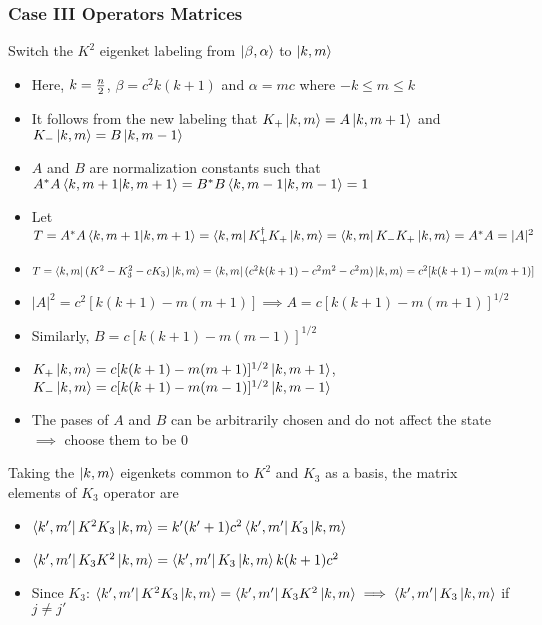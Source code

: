 \documentclass[8pt,t,mathserif,aspectratio=169]{beamer}
\begin{document}
\begin{frame}
  \frametitle{Case III Operators Matrices}
  \vspace{1mm}
  Switch the $K^2$ eigenket labeling from $\ket{\beta,\alpha}$ to $\ket{k,m}$
  \begin{itemize}
    \item Here, $k = {n \over 2}$, $\beta = c^2 k(k + 1)$ and $\alpha = mc$ where $-k \le m \le k$
    \item It follows from the new labeling that $K_{+} \ket{k,m} = A \ket{k,m+1}$ and $K_{-} \ket{k,m} = B \ket{k,m-1}$
    \item $A$ and $B$ are normalization constants such that $A^{*}A \braket{k,m+1}{k,m+1} = B^{*}B \braket{k,m-1}{k,m-1} = 1$
    \item Let $T = A^{*}A \braket{k,m+1}{k,m+1} = \bra{k,m} K^{\dagger}_{+} K_{+} \ket{k,m} = \bra{k,m} K_{-} K_{+} \ket{k,m} = A^{*}A = |A|^2$
    \item $T = \bra{k,m} (K^{2} - K_{3}^{2} - c K_3) \ket{k,m} = \bra{k,m}(c^2{k(k + 1)} - c^2 m^2 - c^2m)\ket{k,m} = c^2[k(k + 1) - m(m + 1)]$
    \item $|A|^2 = c^2[k(k + 1) - m(m + 1)] \implies A = c[k(k + 1) - m(m + 1)]^{1/2}$
    \item Similarly, $B = c[k(k + 1) - m(m - 1)]^{1/2}$
    \item $K_{+} \ket{k,m} = c[k(k + 1) - m(m + 1)]^{1/2} \ket{k,m + 1}$, $K_{-} \ket{k,m} = c[k(k + 1) - m(m - 1)]^{1/2} \ket{k,m - 1}$
    \item The pases of $A$ and $B$ can be arbitrarily chosen and do not affect the state $\implies$ choose them to be $0$
  \end{itemize}
  Taking the $\ket{k,m}$ eigenkets common to $K^2$ and $K_3$ as a basis, the matrix elements of $K_3$ operator are
  \begin{itemize}
    \item $\bra{k',m'} K^2 K_3 \ket{k,m} = k'(k' + 1)c^2 \bra{k',m'} K_3 \ket{k,m}$
    \item $\bra{k',m'} K_3 K^2 \ket{k,m} = \bra{k',m'} K_3 \ket{k,m} k(k + 1)c^2$
    \item Since $K_3$: $\bra{k',m'} K^2 K_3 \ket{k,m} = \bra{k',m'} K_3 K^2 \ket{k,m} \implies \bra{k',m'} K_3 \ket{k,m}$ if $j \neq j'$
  \end{itemize}
\end{frame}
\end{document}
